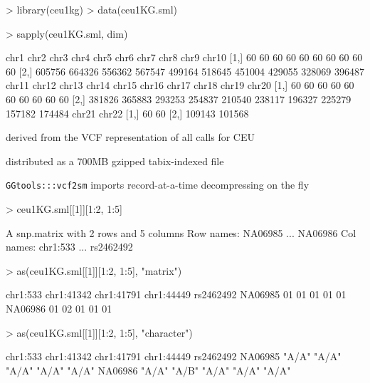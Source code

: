 \begin{Schunk}
\begin{Sinput}
> library(ceu1kg)
> data(ceu1KG.sml)
\end{Sinput}
\end{Schunk}
\begin{Schunk}
\begin{Sinput}
> sapply(ceu1KG.sml, dim)
\end{Sinput}
\begin{Soutput}
       chr1   chr2   chr3   chr4   chr5   chr6   chr7   chr8   chr9  chr10
[1,]     60     60     60     60     60     60     60     60     60     60
[2,] 605756 664326 556362 567547 499164 518645 451004 429055 328069 396487
      chr11  chr12  chr13  chr14  chr15  chr16  chr17  chr18  chr19  chr20
[1,]     60     60     60     60     60     60     60     60     60     60
[2,] 381826 365883 293253 254837 210540 238117 196327 225279 157182 174484
      chr21  chr22
[1,]     60     60
[2,] 109143 101568
\end{Soutput}
\end{Schunk}
{\huge
\bi
\item derived from the VCF representation of all calls for CEU
\item distributed as a 700MB gzipped tabix-indexed file
\item \texttt{GGtools:::vcf2sm} imports record-at-a-time
decompressing on the fly
\ei
}

\clearpage

\begin{Schunk}
\begin{Sinput}
> ceu1KG.sml[[1]][1:2, 1:5]
\end{Sinput}
\begin{Soutput}
A snp.matrix with  2 rows and  5 columns
Row names:  NA06985 ... NA06986 
Col names:  chr1:533 ... rs2462492 
\end{Soutput}
\begin{Sinput}
> as(ceu1KG.sml[[1]][1:2, 1:5], "matrix")
\end{Sinput}
\begin{Soutput}
        chr1:533 chr1:41342 chr1:41791 chr1:44449 rs2462492
NA06985       01         01         01         01        01
NA06986       01         02         01         01        01
\end{Soutput}
\begin{Sinput}
> as(ceu1KG.sml[[1]][1:2, 1:5], "character")
\end{Sinput}
\begin{Soutput}
        chr1:533 chr1:41342 chr1:41791 chr1:44449 rs2462492
NA06985 "A/A"    "A/A"      "A/A"      "A/A"      "A/A"    
NA06986 "A/A"    "A/B"      "A/A"      "A/A"      "A/A"    
\end{Soutput}
\end{Schunk}

